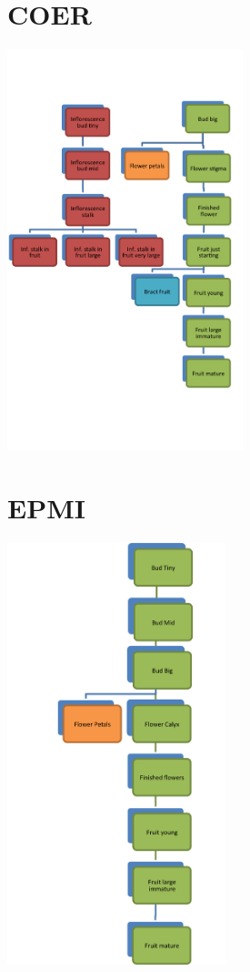 \documentclass[10pt]{book} %
\begin{document}
\section{COER}
\begin{multicols}{2}
\includegraphics[width=2.7in]{images/COER.png}
\vfill
\columnbreak

\end{multicols}

\clearpage
\newpage


\section{EPMI}
\begin{multicols}{2}
\includegraphics[width=2.5in]{images/EPMI.png}
\vfill
\columnbreak

\end{multicols}
\end{document}
